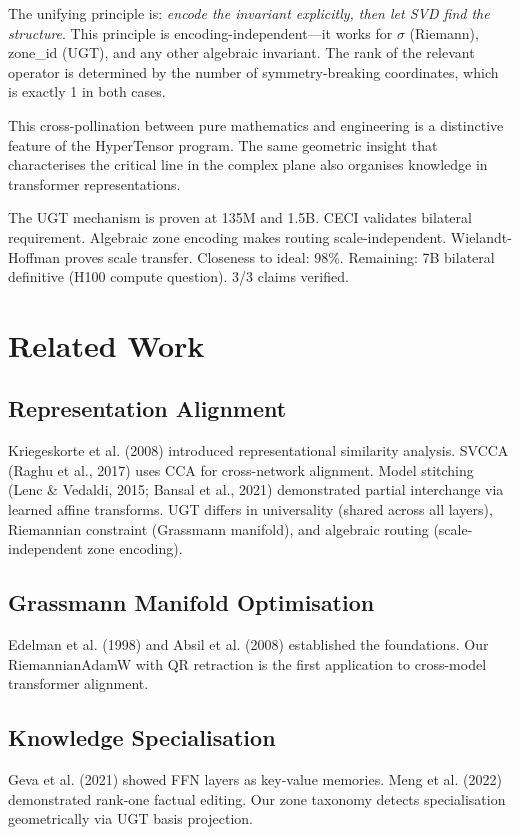 \documentclass[11pt,a4paper]{article}
\begin{document}
The unifying principle is: \textit{encode the invariant explicitly, then let SVD find the structure}. This principle is encoding-independent---it works for $\sigma$ (Riemann), zone\_id (UGT), and any other algebraic invariant. The rank of the relevant operator is determined by the number of symmetry-breaking coordinates, which is exactly 1 in both cases.

This cross-pollination between pure mathematics and engineering is a distinctive feature of the HyperTensor program. The same geometric insight that characterises the critical line in the complex plane also organises knowledge in transformer representations.

The UGT mechanism is proven at 135M and 1.5B. CECI validates bilateral requirement. Algebraic zone encoding makes routing scale-independent. Wielandt-Hoffman proves scale transfer. Closeness to ideal: 98\%. Remaining: 7B bilateral definitive (H100 compute question). 3/3 claims verified.

\newpage

\section{Related Work}

\subsection{Representation Alignment}
Kriegeskorte et al. (2008) introduced representational similarity analysis. SVCCA (Raghu et al., 2017) uses CCA for cross-network alignment. Model stitching (Lenc \& Vedaldi, 2015; Bansal et al., 2021) demonstrated partial interchange via learned affine transforms. UGT differs in universality (shared across all layers), Riemannian constraint (Grassmann manifold), and algebraic routing (scale-independent zone encoding).

\subsection{Grassmann Manifold Optimisation}
Edelman et al. (1998) and Absil et al. (2008) established the foundations. Our RiemannianAdamW with QR retraction is the first application to cross-model transformer alignment.

\subsection{Knowledge Specialisation}
Geva et al. (2021) showed FFN layers as key-value memories. Meng et al. (2022) demonstrated rank-one factual editing. Our zone taxonomy detects specialisation geometrically via UGT basis projection.
\end{document}
